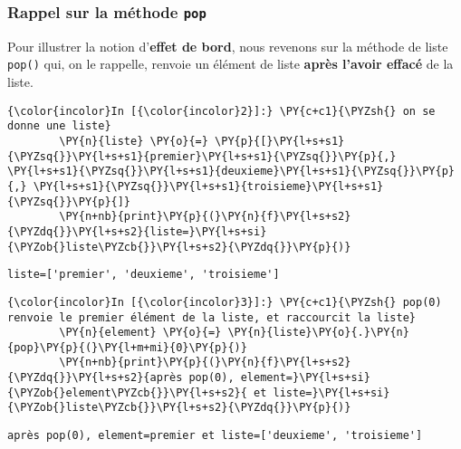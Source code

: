     \hypertarget{rappel-sur-la-muxe9thode-pop}{%
\subsubsection{\texorpdfstring{Rappel sur la méthode
\texttt{pop}}{Rappel sur la méthode pop}}\label{rappel-sur-la-muxe9thode-pop}}

    Pour illustrer la notion d'\textbf{effet de bord}, nous revenons sur la
méthode de liste \texttt{pop()} qui, on le rappelle, renvoie un élément
de liste \textbf{après l'avoir effacé} de la liste.

    \begin{Verbatim}[commandchars=\\\{\},frame=single,framerule=0.3mm,rulecolor=\color{cellframecolor}]
{\color{incolor}In [{\color{incolor}2}]:} \PY{c+c1}{\PYZsh{} on se donne une liste}
        \PY{n}{liste} \PY{o}{=} \PY{p}{[}\PY{l+s+s1}{\PYZsq{}}\PY{l+s+s1}{premier}\PY{l+s+s1}{\PYZsq{}}\PY{p}{,} \PY{l+s+s1}{\PYZsq{}}\PY{l+s+s1}{deuxieme}\PY{l+s+s1}{\PYZsq{}}\PY{p}{,} \PY{l+s+s1}{\PYZsq{}}\PY{l+s+s1}{troisieme}\PY{l+s+s1}{\PYZsq{}}\PY{p}{]}
        \PY{n+nb}{print}\PY{p}{(}\PY{n}{f}\PY{l+s+s2}{\PYZdq{}}\PY{l+s+s2}{liste=}\PY{l+s+si}{\PYZob{}liste\PYZcb{}}\PY{l+s+s2}{\PYZdq{}}\PY{p}{)}
\end{Verbatim}


    \begin{Verbatim}[commandchars=\\\{\},frame=single,framerule=0.3mm,rulecolor=\color{cellframecolor}]
liste=['premier', 'deuxieme', 'troisieme']
\end{Verbatim}

    \begin{Verbatim}[commandchars=\\\{\},frame=single,framerule=0.3mm,rulecolor=\color{cellframecolor}]
{\color{incolor}In [{\color{incolor}3}]:} \PY{c+c1}{\PYZsh{} pop(0) renvoie le premier élément de la liste, et raccourcit la liste}
        \PY{n}{element} \PY{o}{=} \PY{n}{liste}\PY{o}{.}\PY{n}{pop}\PY{p}{(}\PY{l+m+mi}{0}\PY{p}{)}
        \PY{n+nb}{print}\PY{p}{(}\PY{n}{f}\PY{l+s+s2}{\PYZdq{}}\PY{l+s+s2}{après pop(0), element=}\PY{l+s+si}{\PYZob{}element\PYZcb{}}\PY{l+s+s2}{ et liste=}\PY{l+s+si}{\PYZob{}liste\PYZcb{}}\PY{l+s+s2}{\PYZdq{}}\PY{p}{)}
\end{Verbatim}


    \begin{Verbatim}[commandchars=\\\{\},frame=single,framerule=0.3mm,rulecolor=\color{cellframecolor}]
après pop(0), element=premier et liste=['deuxieme', 'troisieme']
\end{Verbatim}

